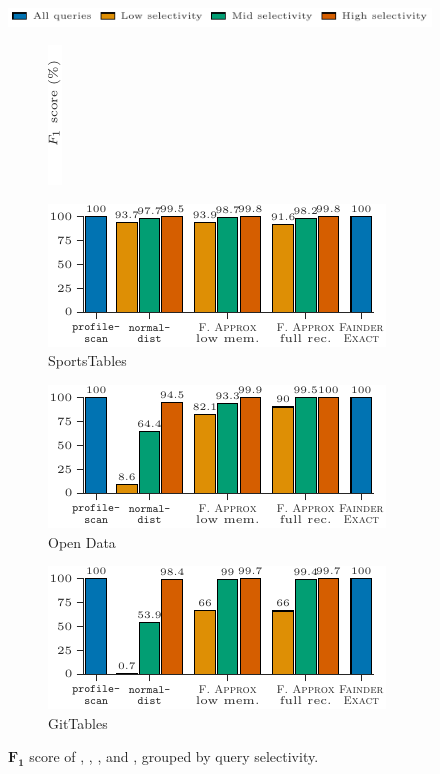 \begin{figure}[t]
    \setlength{\belowcaptionskip}{-4mm}
    \centering
    \includegraphics{figures/figure_16_legend.pdf}\\
    \begin{subfigure}[t]{.03\linewidth}
        \centering
        \includegraphics{figures/figure_16_label.pdf}
    \end{subfigure}%
    \hspace{-0.005\linewidth}%
    \begin{subfigure}[t]{.325\linewidth}
        \centering
        \includegraphics{figures/figure_16_a.pdf}
        \caption{SportsTables}
    \end{subfigure}%
    \begin{subfigure}[t]{.325\linewidth}
        \centering
        \includegraphics{figures/figure_16_b.pdf}
        \caption{Open Data}
    \end{subfigure}%
    \begin{subfigure}[t]{.325\linewidth}
        \centering
        \includegraphics{figures/figure_16_c.pdf}
        \caption{GitTables}
    \end{subfigure}%
    \caption{$\boldsymbol{F_1}$ score of \pscan, \ndist, \approximate{}, and \exact{}, grouped by query selectivity.}
    \label{fig:accuracy_barchart_f1}
\end{figure}

